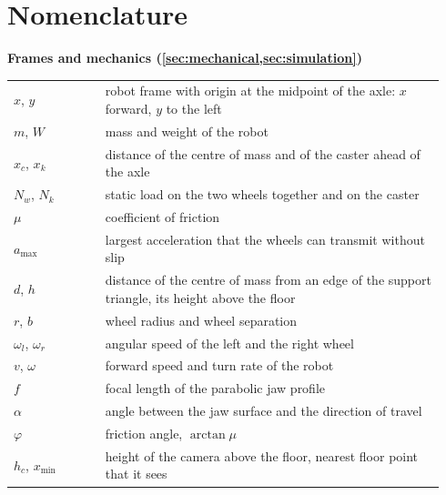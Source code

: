 \section*{Nomenclature}

\noindent\textbf{Frames and mechanics (\cref{sec:mechanical,sec:simulation})}
\begin{center}
\begin{tabular}{@{}p{0.2\linewidth}p{0.74\linewidth}@{}}
$x$, $y$ & robot frame with origin at the midpoint of the axle: $x$ forward, $y$ to the left \\
$m$, $W$ & mass and weight of the robot \\
$x_c$, $x_k$ & distance of the centre of mass and of the caster ahead of the axle \\
$N_w$, $N_k$ & static load on the two wheels together and on the caster \\
$\mu$ & coefficient of friction \\
$a_{\max}$ & largest acceleration that the wheels can transmit without slip \\
$d$, $h$ & distance of the centre of mass from an edge of the support triangle, its height above the floor \\
$r$, $b$ & wheel radius and wheel separation \\
$\omega_l$, $\omega_r$ & angular speed of the left and the right wheel \\
$v$, $\omega$ & forward speed and turn rate of the robot \\
$f$ & focal length of the parabolic jaw profile \\
$\alpha$ & angle between the jaw surface and the direction of travel \\
$\varphi$ & friction angle, $\arctan\mu$ \\
$h_c$, $x_{\min}$ & height of the camera above the floor, nearest floor point that it sees \\
\end{tabular}
\end{center}

